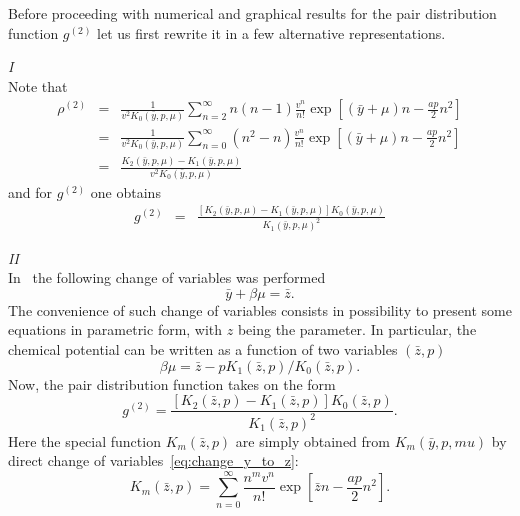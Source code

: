 Before proceeding with numerical and graphical results for the pair distribution function $g^{(2)}$ let us first rewrite it in a few alternative representations.

{\it I}\\
Note that
\begin{eqnarray*}
	\rho^{(2)} & = & \frac{1}{v^2 K_0(\bar{y}, p, \mu)} \sum_{n=2}^{\infty} n(n-1) \frac{v^n}{n!} \exp\left[(\bar{y} + \mu)n - \frac{a p}{2} n^2\right]
	\\
	& = & \frac{1}{v^2 K_0(\bar{y}, p, \mu)} \sum_{n=0}^{\infty} (n^2 - n) \frac{v^n}{n!} \exp\left[(\bar{y} + \mu)n - \frac{a p}{2} n^2\right]
	\\
	& = & \frac{K_2(\bar{y}, p, \mu) - K_1(\bar{y}, p, \mu)}{v^2 K_0(\bar{y}, p, \mu)}
\end{eqnarray*}
and for $g^{(2)}$ one obtains
\begin{eqnarray}
	g^{(2)} & = & \frac{\left[K_2(\bar{y}, p, \mu) - K_1(\bar{y}, p, \mu)\right] K_0(\bar{y}, p, \mu)}{K_1(\bar{y}, p, \mu)^2}
\end{eqnarray}

{\it II}\\
In~\cite{MpkDob2022} the following change of variables was performed
\begin{equation}
	\label{eq:change_y_to_z}
	\bar{y} + \beta\mu = \bar{z}.
\end{equation}
The convenience of such change of variables consists in possibility to present some equations in parametric form, with $z$ being the parameter. In particular, the chemical potential can be written as a function of two variables $(\bar{z}, p)$
\begin{equation*}
	\beta\mu = \bar{z} - p K_1(\bar{z},p)/K_0(\bar{z},p).
\end{equation*}
Now, the pair distribution function takes on the form
\begin{equation}
	g^{(2)} = \frac{\left[K_2(\bar{z}, p) - K_1(\bar{z}, p)\right] K_0(\bar{z}, p)}{K_1(\bar{z}, p)^2}.
\end{equation}
Here the special function $K_m(\bar{z}, p)$ are simply obtained from $K_m(\bar{y}, p, mu)$ by direct change of variables~\eqref{eq:change_y_to_z}:
\begin{equation*}
	K_m(\bar{z},p) = \sum_{n=0}^{\infty} \frac{n^m v^n}{n!} \exp[\bar{z}n - \frac{a p}{2}n^2].
\end{equation*}

